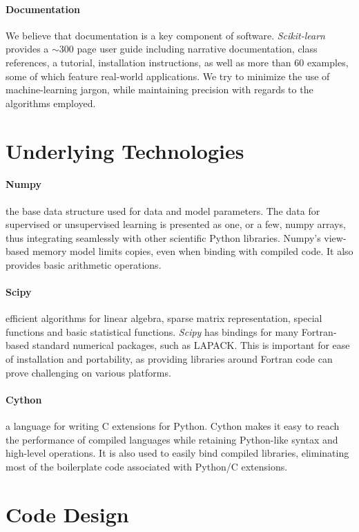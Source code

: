 \documentclass[twoside,11pt]{article}
\begin{document}
\paragraph{Documentation}
%
We believe that documentation is a key component of software.
\emph{Scikit-learn} provides a $\sim$300 page user guide including
narrative documentation, class references, a tutorial, installation
instructions, as well as more than 60 examples, some of which feature
real-world applications. We try to minimize the use of
machine-learning jargon, while maintaining precision with
regards to the algorithms employed.


\section{Underlying Technologies}

\paragraph{Numpy}
%
the base data structure used for data and model parameters.
The data for supervised or unsupervised learning is
presented as one, or a few, numpy arrays, thus integrating seamlessly
with other scientific Python libraries. Numpy's view-based memory
model limits copies, even when binding with compiled code. It also
provides basic arithmetic operations.

\paragraph{Scipy}
%
efficient algorithms for linear algebra, sparse matrix representation,
special functions and basic statistical functions. {\sl Scipy} has
bindings for many Fortran-based standard numerical packages, such as
LAPACK. This is important for ease of installation and portability, as
providing libraries around Fortran code can prove challenging on
various platforms.

\paragraph{Cython}
%
a language for writing C extensions for Python. Cython makes it easy to
reach the performance of compiled languages while retaining
Python-like syntax and high-level operations. It is also used to
easily bind compiled libraries, eliminating most of the boilerplate code
associated with Python/C extensions.

\section{Code Design}
\end{document}
